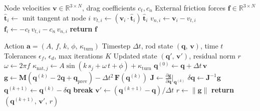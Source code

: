 \documentclass[11pt]{article}
\newcommand{\vect}[1]{\mathbf{#1}}
\newcommand{\mat}[1]{\mathbf{#1}}
\newcommand{\Real}{\mathbb{R}}
\begin{document}
\begin{algorithm}[t]
\caption{Resistive Force Theory (\textsc{ComputeRFT})}\label{alg:rft}
\begin{algorithmic}[1]
\Require Node velocities $\vect{v} \in \Real^{3 \times N}$, drag coefficients $c_t, c_n$
\Ensure External friction forces $\vect{f} \in \Real^{3 \times N}$
    \State $\hat{\vect{t}}_i \gets$ unit tangent at node $i$
    \State $v_{t,i} \gets (\vect{v}_i \cdot \hat{\vect{t}}_i)\,\hat{\vect{t}}_i$
    \State $v_{n,i} \gets \vect{v}_i - v_{t,i}$
    \State $\vect{f}_i \gets -c_t\, v_{t,i} - c_n\, v_{n,i}$
\EndFor
\State \textbf{return} $\vect{f}$
\end{algorithmic}
\end{algorithm}

\begin{algorithm}[t]
\caption{Single RL Step with DisMech Integration (Implicit)}\label{alg:dismech-step}
\begin{algorithmic}[1]
\Require Action $\vect{a} = (A,\, f,\, k,\, \phi,\, \kappa_{\mathrm{turn}})$
\Require Timestep $\Delta t$, rod state $(\vect{q},\, \vect{v})$, time $t$
\Require Tolerances $\epsilon_f$, $\epsilon_d$, max iterations $K$
\Ensure Updated state $(\vect{q}',\, \vect{v}')$, residual norm $r$
\State $\omega \gets 2\pi f$
 
    \State $\kappa_{\mathrm{nat},j} \gets A \sin(k\, s_j + \omega\, t + \phi) + \kappa_{\mathrm{turn}}$
\EndFor
\State $\vect{q}^{(0)} \gets \vect{q} + \Delta t\,\vect{v}$ 
 
    \State $\vect{g} \gets \mat{M}(\vect{q}^{(k)} - 2\vect{q} + \vect{q}_{\mathrm{prev}}) - \Delta t^2\,\vect{F}(\vect{q}^{(k)})$
    \State $\mat{J} \gets \frac{\partial \vect{g}}{\partial \vect{q}}\big|_{\vect{q}^{(k)}}$
    \State $\delta\vect{q} \gets \mat{J}^{-1}\vect{g}$ 
    \State $\vect{q}^{(k+1)} \gets \vect{q}^{(k)} - \delta\vect{q}$
    \If{$\|\vect{g}\| < \epsilon_f$ \textbf{or} $\|\delta\vect{q}\| < \epsilon_d$}
        \State \textbf{break} 
    \EndIf
\EndFor
\State $\vect{v}' \gets (\vect{q}^{(k+1)} - \vect{q}) / \Delta t$
\State $r \gets \|\vect{g}\|$ 
\State \textbf{return} $(\vect{q}^{(k+1)},\, \vect{v}',\, r)$
\end{algorithmic}
\end{algorithm}
\end{document}
